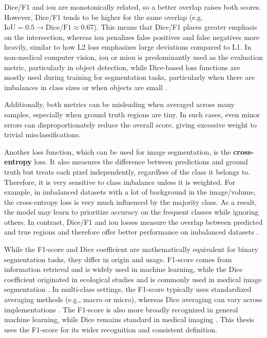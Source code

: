 \medskip

Dice/F1 and \gls{iou} are monotonically related, so a better overlap raises both scores. However, Dice/F1 tends to be higher for the same overlap (e.g.~$\text{IoU}=0.5 \rightarrow \text{Dice/F1} \approx 0.67$). This means that Dice/F1 places greater emphasis on the intersection, whereas \gls{iou} penalizes false positives and false negatives more heavily, similar to how L2 loss emphasizes large deviations compared to L1. In non-medical computer vision, \gls{iou} or \acrshort{miou} is predominantly used as the evaluation metric, particularly in object detection, while Dice-based loss functions are mostly used during training for segmentation tasks, particularly when there are imbalances in class sizes or when objects are small \cite{azad2023lossfunctionserasemantic}. 

\medskip

Additionally, both metrics can be misleading when averaged across many samples, especially when ground truth regions are tiny. In such cases, even minor errors can disproportionately reduce the overall score, giving excessive weight to trivial misclassifications.

\medskip

Another loss function, which can be used for image segmentation, is the {\bf cross-entropy} loss. It also measures the difference between predictions and ground truth but treats each pixel independently, regardless of the class it belongs to. Therefore, it is very sensitive to class imbalance unless it is weighted. For example, in imbalanced datasets with a lot of background in the image/volume, the cross-entropy loss is very much influenced by the majority class. As a result, the model may learn to prioritize accuracy on the frequent classes while ignoring others. In contrast, Dice/F1 and \gls{iou} losses measure the overlap between predicted and true regions and therefore offer better performance on imbalanced datasets \cite{azad2023lossfunctionserasemantic}.

\bigskip

While the F1-score and Dice coefficient are mathematically equivalent for binary segmentation tasks, they differ in origin and usage. F1-score comes from information retrieval and is widely used in machine learning, while the Dice coefficient originated in ecological studies \cite{enwiki:1297073156} and is commonly used in medical image segmentation \cite{taha2015metrics}. In multi-class settings, the F1-score typically uses standardized averaging methods (e.g., macro or micro), whereas Dice averaging can vary across implementations \cite{yeung2021unified}. The F1-score is also more broadly recognized in general machine learning, while Dice remains standard in medical imaging \cite{Reinke_2024}. This thesis uses the F1-score for its wider recognition and consistent definition.
